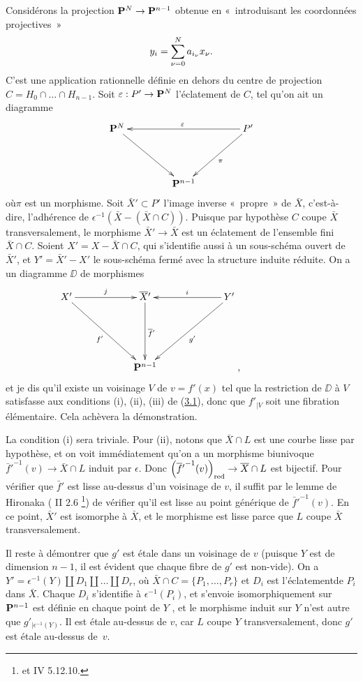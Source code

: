 \documentclass[10pt]{../fichiers-configuration-latex/smfart}
\begin{document}
Considérons la projection $\mathbf{P}^N\rightarrow \mathbf{P}^{n-1}$
obtenue en « introduisant les coordonnées projectives »
$$
y_i=\sum^N_{\nu =0}a_{i_{\nu}}x_{\nu}{}.
$$
C'est une application rationnelle définie en dehors du centre de
projection $C=H_0\cap\ldots \cap H_{n-1}$. Soit $\varepsilon
:P'\rightarrow \mathbf{P}^N$ l'éclatement de $C$, tel qu'on ait un
diagramme
$$
\xymatrix@=1.5cm{
\PP^{N}  \ar[rd]& &P'\ar[ld]^{\pi}\ar[ll]_{\epsilon}\\
               &\PP^{n-1} &
}
$$
où\pageoriginale $\pi$ est un morphisme. Soit $\bar{X}{}'\subset P'$
l'image inverse « propre » de $\bar{X}$, c'est-à-dire,
l'adhérence de $\epsilon^{-1}(\bar{X}-(\bar{X}\cap C))$. Puisque par
hypothèse $C$ coupe $\bar{X}$ transversalement, le morphisme
$\bar{X}{}'\rightarrow \bar{X}$ est un éclatement de l'ensemble fini
$\bar{X}\cap C$. Soient $X'=X-\bar{X}\cap C$, qui s'identifie aussi à
un sous-schéma ouvert de $\bar{X}{}'$, et $Y'=\bar{X}{}'-X'$ le
sous-schéma fermé avec la structure induite réduite. On a un diagramme
$\DD$ de morphismes
$$
\xymatrix@=2cm{
  X'  \ar[r]^{j} \ar[rd]_{f'}& \bar{X}{}'  \ar[d]^{\bar{f}{}'} & Y'\ar[l]_{i} \ar[ld]^{g'}     &\\
                           & \PP^{n-1} &\qquad ,   
}
$$
et je dis qu'il existe un voisinage $V$ de $v=f'(x)$ tel que la
restriction de $\DD$ à $V$ satisfasse aux conditions (i), (ii),
(iii) de (\hyperref[XI.def3.1]{3.1}), donc que $f'_{\mid V}$ soit une fibration
élémentaire. Cela achèvera la démonstration.

La condition (i) sera triviale. Pour (ii), notons que $\bar{X}\cap L$
est une courbe lisse par hypothèse, et on voit immédiatement qu'on a
un morphisme biunivoque ${\bar{f}{}'}^{-1}(v)\rightarrow \bar{X}\cap L$ %
induit par $\epsilon$. Donc $\left({\overline{f}{}'}^{-1}(v)\right)_{\operatorname{red}}\rightarrow
\overline{X}\cap L$ est bijectif. Pour vérifier que $\bar{f}{}'$ est lisse
au-dessus d'un voisinage de $v$, il suffit par le lemme de Hironaka
( II 2.6 %
\footnote{et \EGA IV 5.12.10.}) de vérifier qu'il
est lisse au point générique de ${\bar{f}{}'}^{-1}(v)$. En ce point,
$\bar{X}{}'$ est isomorphe à $\bar{X}$, et le morphisme est lisse parce
que $L$ coupe $\bar{X}$ transversalement.

Il reste à démontrer que $g'$ est étale dans un voisinage de $v$
(puisque $Y$ est de dimension $n-1$, il est évident que chaque fibre
de $g'$ est non-vide). On a $Y'=\epsilon^{-1}(Y)\amalg D_1
\amalg\ldots \amalg D_r$, où $\bar{X}\cap C=\{P_1,\ldots,P_r\}$ et
$D_i$ est l'éclatement\pageoriginale de $P_i$ dans $\bar{X}$. Chaque $D_i$
s'identifie à $\epsilon^{-1}(P_i)$, et s'envoie isomorphiquement sur
$\mathbf{P}^{n-1}$ est définie en chaque point de
$Y$%
, et le morphisme
induit sur $Y$ n'est autre que $g'_{\mid \epsilon^{-1}(Y)}$. Il est étale
au-dessus de $v$, car $L$ coupe $Y$ transversalement, donc $g'$ est
étale au-dessus de~$v$.
\end{document}
